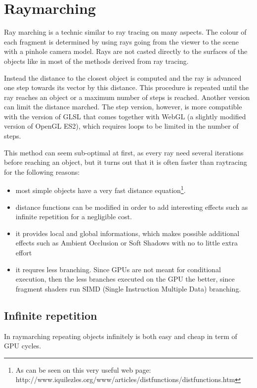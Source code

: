 \chapter{Raymarching}

Ray marching is a technic similar to ray tracing on many aspects. The colour of
each fragment is determined by using rays going from the viewer to the scene with
a pinhole camera model. Rays are not casted directly to the surfaces of the objects
like in most of the methods derived from ray tracing.

Instead the distance to the closest object is computed and the ray is advanced one step towards
its vector by this distance. This procedure is repeated
until the ray reaches an object or a maximum number of steps is reached. Another version can limit
the distance marched. The step version, however, is more compatible with the version
of GLSL that comes together with WebGL (a slightly modified version of OpenGL ES2), which requires
loops to be limited in the number of steps. 

This method can seem sub-optimal at first, as every ray need several iterations before reaching an object,
but it turns out that it is often faster than raytracing for the following reasons:
\begin{itemize}
 \item most simple objects have a very fast distance equation\footnote{As can be seen on this
 	very useful web page: http://www.iquilezles.org/www/articles/distfunctions/distfunctions.htm}.
 \item distance functions can be modified in order to add interesting effects such as
	infinite repetition for a negligible cost.
 \item it provides local and global informations, which makes possible additional effects
 	such as Ambient Occlusion or Soft Shadows with no to little extra effort
 \item it requres less branching. Since GPUs are not meant for conditional execution, then
 	the less branches executed on the GPU the better, since fragment shaders run SIMD
 	(Single Instruction Multiple Data) branching.
\end{itemize}

\section{Infinite repetition} 

In raymarching repeating objects infinitely is both easy and cheap in term of GPU cycles.

